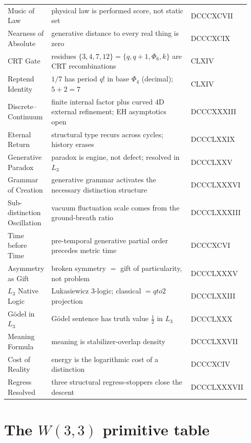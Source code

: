 \documentclass[11pt]{article}
\def\Phi#1{Phi#1}%
\def\L{L}%
\def\to{ to }%
\begin{document}
{\begin{longtable}{>{\raggedright\arraybackslash}p{0.18\linewidth} >{\raggedright\arraybackslash}p{0.63\linewidth} >{\raggedright\arraybackslash}p{0.13\linewidth}}
Music of Law & physical law is performed score, not static set & DCCCXCVII \\
Nearness of Absolute & generative distance to every real thing is zero & DCCCXCIX \\
CRT Gate & residues $\{3,4,7,12\}=\{q,q\!+\!1,\Phi_6,k\}$ are CRT recombinations & CLXIV \\
Reptend Identity & $1/7$ has period $q!$ in base $\Phi_4$ (decimal); $5+2=7$ & CLXIV \\
Discrete--Continuum & finite internal factor plus curved $4$D external refinement; EH asymptotics open & DCCCXXXIII \\
Eternal Return & structural type recurs across cycles; history erases & DCCCLXXIX \\
Generative Paradox & paradox is engine, not defect; resolved in $L_3$ & DCCCLXXV \\
Grammar of Creation & generative grammar activates the necessary distinction structure & DCCCLXXXVI \\
Sub-distinction Oscillation & vacuum fluctuation scale comes from the ground-breath ratio & DCCCLXXXIII \\
Time before Time & pre-temporal generative partial order precedes metric time & DCCCXCVI \\
Asymmetry as Gift & broken symmetry $=$ gift of particularity, not problem & DCCCLXXXV \\
$L_3$ Native Logic & \L{}ukasiewicz $3$-logic; classical $=q\to 2$ projection & DCCCLXXIII \\
G\"odel in $L_3$ & G\"odel sentence has truth value $\tfrac{1}{2}$ in $L_3$ & DCCCLXXX \\
Meaning Formula & meaning is stabilizer-overlap density & DCCCLXXVII \\
Cost of Reality & energy is the logarithmic cost of a distinction & DCCCXCIV \\
Regress Resolved & three structural regress-stoppers close the descent & DCCCLXXXVII \\
\end{longtable}
}

\section{\texorpdfstring{The $W(3,3)$ primitive table}{The W(3,3) primitive table}}
\end{document}

